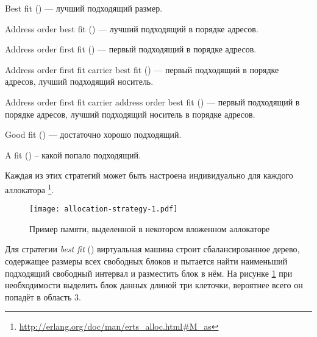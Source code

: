 \begin{enumerate*}
	\item Best fit () --- лучший подходящий размер.
	\item Address order best fit () --- лучший подходящий в порядке адресов.
	\item Address order first fit () --- первый подходящий в порядке адресов.
	\item Address order first fit carrier best fit () --- первый подходящий в порядке адресов, лучший подходящий носитель.
	\item Address order first fit carrier address order best fit () --- первый подходящий в порядке адресов, лучший подходящий носитель в порядке адресов.
	\item Good fit () --- достаточно хорошо подходящий.
	\item A fit () -- какой попало подходящий.
\end{enumerate*}

Каждая из этих стратегий может быть настроена индивидуально для каждого аллокатора \footnote{\href{http://erlang.org/doc/man/erts\_alloc.html\#M\_as}{http://erlang.org/doc/man/erts\_alloc.html\#M\_as}}.

\begin{figure}
  \texttt{[image: allocation-strategy-1.pdf]}%
  \centering%
	\caption{Пример памяти, выделенной в некотором вложенном аллокаторе}
   \label{fig:allocation-strategy-1}
\end{figure}
\FloatBarrier

Для стратегии \emph{best fit} () виртуальная машина строит сбалансированное дерево, содержащее размеры всех свободных блоков и пытается найти наименьший подходящий свободный интервал и разместить блок в нём. На рисунке \ref{fig:allocation-strategy-1} при необходимости выделить блок данных длиной три клеточки, вероятнее всего он попадёт в область 3.

